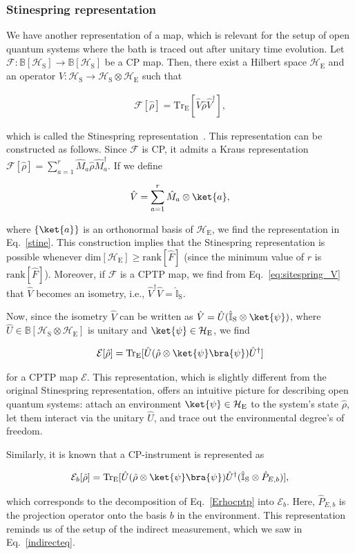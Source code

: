 \documentclass[preprint,pteplogo]{ptephy_v2}%
\numberwithin{equation}{section}
\theoremstyle{definition}
\newcommand{\ml}[1]{\mathcal{#1}}
\newcommand{\mr}[1]{\mathrm{#1}}
\newcommand{\mbb}[1]{\mathbb{#1}}
\newcommand{\aln}[1]{
\begin{align}
#1
\end{align}
}
\newcommand{\ra}{\rightarrow}
\newcommand{\Tr}{\mr{Tr}}
\begin{document}
\subsubsection{Stinespring representation}
We have another representation of a map, which is relevant for the setup of open quantum systems where the bath is traced out after unitary time evolution.
Let $\ml{F}:\mbb{B}[\ml{H}_\mr{S}]\ra\mbb{B}[\ml{H}_\mr{S}]$ be a CP map.
Then, there exist a Hilbert space $\ml{H}_\mr{E}$ and an operator $\hat{V}:\ml{H}_\mr{S}\ra \ml{H}_\mr{S}\otimes\ml{H}_\mr{E}$ such that
\aln{\label{stine}
\ml{F}[\hat{\rho}]=\Tr_\mr{E}[\hat{V}\hat{\rho}\hat{V}^\dag],
}
which is called the Stinespring representation~\cite{stinespring1955positive}.
This representation can be constructed as follows. 
Since $\ml{F}$ is CP, it admits a Kraus representation $\ml{F}[\hat{\rho}]=\sum_{a=1}^r\hat{M}_a\hat{\rho}\hat{M}_a^\dag$.
If we define
\aln{\label{eq:sitespring_V}
\hat{V}=\sum_{a=1}^r\hat{M}_a\otimes \ket{a},
}
where $\{\ket{a}\}$ is an orthonormal basis of $\ml{H}_\mr{E}$, we find the representation in Eq.~\eqref{stine}.
This construction implies that the Stinespring representation is possible whenever $\mr{dim}[\ml{H}_\mr{E}]\geq \mr{rank}[\hat{F}]$ (since the minimum value of $r$ is $\mr{rank}[\hat{F}]$).
Moreover, if $\ml{F}$ is a CPTP map, we find from Eq.~\eqref{eq:sitespring_V} that $\hat{V}$ becomes an isometry, i.e., $\hat{V}^\dag\hat{V}=\hat{\mbb{I}}_\mr{S}$.

Now, since the isometry $\hat{V}$ can be written as $\hat{V}=\hat{U}(\hat{\mbb{I}}_\mr{S}\otimes \ket{\psi})$, where $\hat{U}\in\mbb{B}[\ml{H}_\mr{S}\otimes\ml{H}_\mr{E}]$ is unitary and $\ket{\psi}\in \ml{H}_\mr{E}$, we find~\cite{wolf2012quantum, barberena2024overview}
\aln{\label{Erhocptp}
\ml{E}[\hat{\rho}]=\mr{Tr}_\mr{E}[\hat{U}(\hat{\rho}\otimes\ket{\psi}\bra{\psi})\hat{U}^\dag]
}
for a CPTP map $\ml{E}$.
This representation, which is slightly different from the original Stinespring representation, offers an intuitive picture for describing open quantum systems: attach an environment $\ket{\psi}\in\ml{H}_\mr{E}$ to the system's state $\hat{\rho}$, let them interact via the unitary $\hat{U}$, and trace out the environmental degree's of freedom.

Similarly, it is known that a CP-instrument is represented as~\cite{wolf2012quantum, sagawa2013second}
\aln{
\ml{E}_b[\hat{\rho}]=\mr{Tr}_\mr{E}[\hat{U}(\hat{\rho}\otimes\ket{\psi}\bra{\psi})\hat{U}^\dag(\hat{\mbb{I}}_\mr{S}\otimes \hat{P}_{E,b})],
}
which corresponds to the decomposition of Eq.~\eqref{Erhocptp} into $\ml{E}_b$.
Here, $\hat{P}_{E,b}$ is the projection operator onto the basis $b$ in the environment. 
This representation reminds us of the setup of the indirect measurement, which we saw in Eq.~\eqref{indirecteq}.
\end{document}
